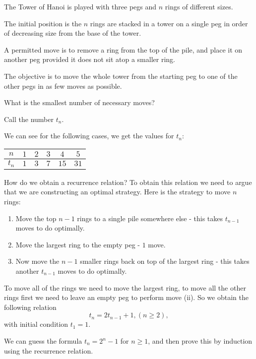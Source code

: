 \documentclass[10pt, a4paper]{article}
\begin{document}
\begin{example}[H3]
    The Tower of Hanoi is played with three pegs and $n$ rings of different sizes.
    
    The initial position is the $n$ rings are stacked in a tower on a single peg in order of decreasing size from the base of the tower.

    A permitted move is to remove a ring from the top of the pile,
    and place it on another peg provided it does not sit atop a smaller ring.

    The objective is to move the whole tower from the starting peg to one of the other pegs in as few moves as possible.

    What is the smallest number of necessary moves?

    Call the number $t_n$.

    We can see for the following cases,
    we get the values for $t_n$:
    \begin{table}[H]
        \centering
        \begin{tabular}{c|ccccc}
             $n$ & $1$ & $2$ & $3$ & $4$ & $5$ \\
             \hline
             $t_n$ & $1$ & $3$ & $7$ & $15$ & $31$
        \end{tabular}
    \end{table}
    How do we obtain a recurrence relation?
    To obtain this relation we need to argue that we are constructing an optimal strategy.
    Here is the strategy to move $n$ rings:
    \begin{enumerate}[label = (\roman*)]
        \item Move the top $n - 1$ rings to a single pile somewhere else - this takes $t_{n - 1}$ moves to do optimally.
        \item Move the largest ring to the empty peg - $1$ move.
        \item Now move the $n - 1$ smaller rings back on top of the largest ring - this takes another $t_{n - 1}$ moves to do optimally.
    \end{enumerate}
    To move all of the rings we need to move the largest ring,
    to move all the other rings first we need to leave an empty peg to perform move (ii).
    So we obtain the following relation
    \[
    t_n = 2t_{n - 1} + 1, (n \geq 2),
    \]
    with initial condition $t_1 = 1$.
    
    We can guess the formula $t_n = 2 ^ n - 1$ for $n \geq 1$,
    and then prove this by induction using the recurrence relation.
\end{example}
\end{document}
